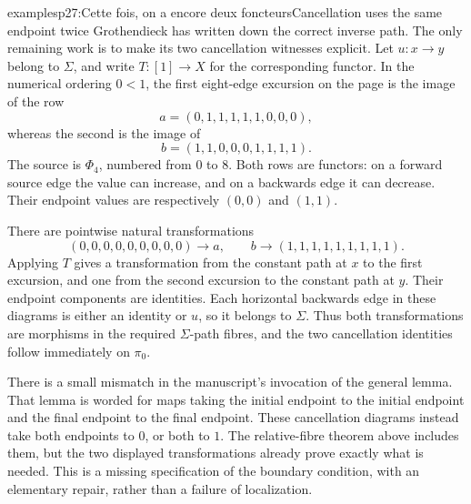 \begin{dcomment}{examples}{p27:Cette fois, on a encore deux foncteurs}{Cancellation uses the same endpoint twice}
Grothendieck has written down the correct inverse path. The only remaining work is to make its two cancellation witnesses explicit. Let $u:x\to y$ belong to $\Sigma$, and write $T:[1]\to X$ for the corresponding functor. In the numerical ordering $0<1$, the first eight-edge excursion on the page is the image of the row
\[
 a=(0,1,1,1,1,1,0,0,0),
\]
whereas the second is the image of
\[
 b=(1,1,0,0,0,1,1,1,1).
\]
The source is $\Phi_4$, numbered from $0$ to $8$. Both rows are functors: on a forward source edge the value can increase, and on a backwards edge it can decrease. Their endpoint values are respectively $(0,0)$ and $(1,1)$.

There are pointwise natural transformations
\[
 (0,0,0,0,0,0,0,0,0)\longrightarrow a,
 \qquad
 b\longrightarrow(1,1,1,1,1,1,1,1,1).
\]
Applying $T$ gives a transformation from the constant path at $x$ to the first excursion, and one from the second excursion to the constant path at $y$. Their endpoint components are identities. Each horizontal backwards edge in these diagrams is either an identity or $u$, so it belongs to $\Sigma$. Thus both transformations are morphisms in the required $\Sigma$-path fibres, and the two cancellation identities follow immediately on $\pi_0$.

There is a small mismatch in the manuscript's invocation of the general lemma. That lemma is worded for maps taking the initial endpoint to the initial endpoint and the final endpoint to the final endpoint. These cancellation diagrams instead take both endpoints to $0$, or both to $1$. The relative-fibre theorem above includes them, but the two displayed transformations already prove exactly what is needed. This is a missing specification of the boundary condition, with an elementary repair, rather than a failure of localization.
\end{dcomment}

